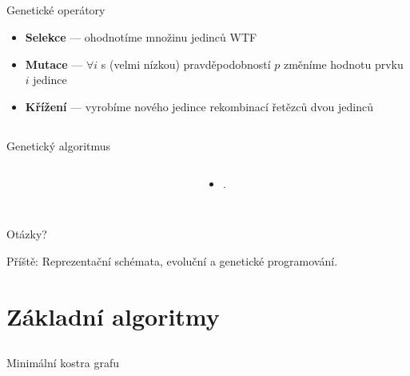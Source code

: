 \documentclass{beamer}
\begin{document}
\subsection{}
\begin{frame}{Genetické operátory}
\begin{itemize}
\item {\bf Selekce} --- ohodnotíme množinu jedinců WTF
\item {\bf Mutace} --- $\forall i$ s (velmi nízkou) pravděpodobností $p$ změníme hodnotu prvku $i$ jedince
\item {\bf Křížení} --- vyrobíme nového jedince rekombinací řetězců dvou jedinců
\end{itemize}
\end{frame}

\subsection{}
\begin{frame}{Genetický algoritmus}
\begin{columns}
\begin{column}{5cm}
\end{column}
\begin{column}{6cm}
\begin{itemize}
\item .
\end{itemize}
\end{column}
\end{columns}
\end{frame}

\subsection{}
\begin{frame}{Otázky?}
\begin{center}
Příště: Reprezentační schémata, evoluční a genetické programování.
\end{center}
\end{frame}

\section{Základní algoritmy}

\subsection{}
\begin{frame}{Minimální kostra grafu}
\end{frame}
\end{document}
